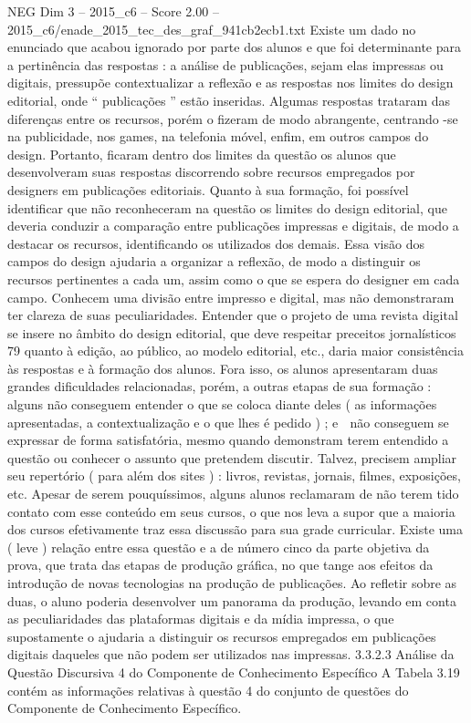 \begin{textsample}{NEG Dim 3 – 2015\_c6 – Score 2.00 – 2015\_c6/enade\_2015\_tec\_des\_graf\_941cb2ecb1.txt}
Existe um dado no enunciado que acabou ignorado por parte dos alunos e que foi determinante para a pertinência das respostas : a análise de publicações, sejam elas impressas ou digitais, pressupõe contextualizar a reflexão e as respostas nos limites do design editorial, onde “ publicações ” estão inseridas.
Algumas respostas trataram das diferenças entre os recursos, porém o fizeram de modo abrangente, centrando -se na publicidade, nos games, na telefonia móvel, enfim, em outros campos do design.
Portanto, ficaram dentro dos limites da questão os alunos que desenvolveram suas respostas discorrendo sobre recursos empregados por designers em publicações editoriais.
Quanto à sua formação, foi possível identificar que não reconheceram na questão os limites do design editorial, que deveria conduzir a comparação entre publicações impressas e digitais, de modo a destacar os recursos, identificando os utilizados dos demais.
Essa visão dos campos do design ajudaria a organizar a reflexão, de modo a distinguir os recursos pertinentes a cada um, assim como o que se espera do designer em cada campo.
Conhecem uma divisão entre impresso e digital, mas não demonstraram ter clareza de suas peculiaridades.
Entender que o projeto de uma revista digital se insere no âmbito do design editorial, que deve respeitar preceitos jornalísticos 79 quanto à edição, ao público, ao modelo editorial, etc., daria maior consistência às respostas e à formação dos alunos.
Fora isso, os alunos apresentaram duas grandes dificuldades relacionadas, porém, a outras etapas de sua formação :  alguns não conseguem entender o que se coloca diante deles ( as informações apresentadas, a contextualização e o que lhes é pedido ) ; e  não conseguem se expressar de forma satisfatória, mesmo quando demonstram terem entendido a questão ou conhecer o assunto que pretendem discutir.
Talvez, precisem ampliar seu repertório ( para além dos sites ) : livros, revistas, jornais, filmes, exposições, etc.
Apesar de serem pouquíssimos, alguns alunos reclamaram de não terem tido contato com esse conteúdo em seus cursos, o que nos leva a supor que a maioria dos cursos efetivamente traz essa discussão para sua grade curricular.
Existe uma ( leve ) relação entre essa questão e a de número cinco da parte objetiva da prova, que trata das etapas de produção gráfica, no que tange aos efeitos da introdução de novas tecnologias na produção de publicações.
Ao refletir sobre as duas, o aluno poderia desenvolver um panorama da produção, levando em conta as peculiaridades das plataformas digitais e da mídia impressa, o que supostamente o ajudaria a distinguir os recursos empregados em publicações digitais daqueles que não podem ser utilizados nas impressas. 3.3.2.3 Análise da Questão Discursiva 4 do Componente de Conhecimento Específico A Tabela 3.19 contém as informações relativas à questão 4 do conjunto de questões do Componente de Conhecimento Específico.

\end{textsample}
